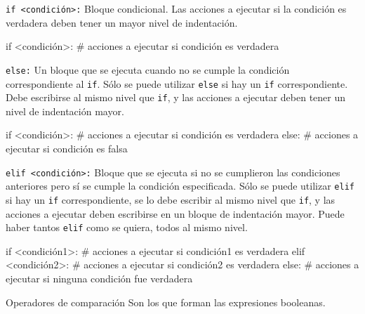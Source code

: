 \newpage
\begin{referencia_python}

\begin{sintaxis}{\lstinline!if <condición>:!}
Bloque condicional.  Las acciones a ejecutar si la condición
es verdadera deben tener un mayor nivel de indentación.
\begin{codigo-python-sn}
if <condición>:
    # acciones a ejecutar si condición es verdadera
\end{codigo-python-sn}
\end{sintaxis}

\begin{sintaxis}{\lstinline!else:!}
Un bloque que se ejecuta cuando no se cumple la condición
correspondiente al \lstinline!if!.  Sólo se puede utilizar
\lstinline!else! si hay un \lstinline!if! correspondiente.  Debe
escribirse al mismo nivel que \lstinline!if!, y las acciones a ejecutar
deben tener un nivel de indentación mayor.
\begin{codigo-python-sn}
if <condición>:
    # acciones a ejecutar si condición es verdadera
else:
    # acciones a ejecutar si condición es falsa
\end{codigo-python-sn}
\end{sintaxis}

\begin{sintaxis}{\lstinline!elif <condición>:!}
Bloque que se ejecuta si no se cumplieron las condiciones
anteriores pero sí se cumple la condición especificada.  Sólo se puede utilizar
\lstinline!elif! si hay un \lstinline!if! correspondiente, se lo debe
escribir al mismo nivel que \lstinline!if!, y las acciones a ejecutar deben
escribirse en un bloque de indentación mayor.  Puede haber tantos
\lstinline!elif! como se quiera, todos al mismo nivel.
\begin{codigo-python-sn}
if <condición1>:
    # acciones a ejecutar si condición1 es verdadera
elif <condición2>:
	# acciones a ejecutar si condición2 es verdadera
else:
    # acciones a ejecutar si ninguna condición fue verdadera
\end{codigo-python-sn}
\end{sintaxis}

\begin{sintaxis}{Operadores de comparación}
Son los que forman las expresiones booleanas.


\end{sintaxis}
\end{referencia_python}

